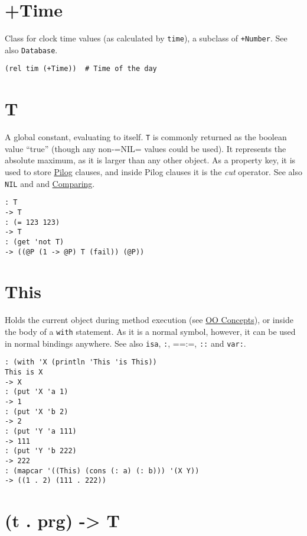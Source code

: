 {{{{{{{{ 
\section{+Time}
\label{sec-8-1-20-3}


Class for clock time values (as calculated by \texttt{time}), a subclass of
\texttt{+Number}. See also \texttt{Database}.


\begin{verbatim}
(rel tim (+Time))  # Time of the day
\end{verbatim}

 
\section{T}
\label{sec-8-1-20-4}


A global constant, evaluating to itself. \texttt{T} is commonly returned as the
boolean value ``true'' (though any non-=NIL= values could be used). It
represents the absolute maximum, as it is larger than any other object.
As a property key, it is used to store \hyperref[ref.html-pilog]{Pilog}
clauses, and inside Pilog clauses it is the \emph{cut} operator. See also
\texttt{NIL} and and \hyperref[ref.html-cmp]{Comparing}.


\begin{verbatim}
: T
-> T
: (= 123 123)
-> T
: (get 'not T)
-> ((@P (1 -> @P) T (fail)) (@P))
\end{verbatim}

 
\section{This}
\label{sec-8-1-20-5}


Holds the current object during method execution (see \hyperref[ref.html-oop]{OO Concepts}), or inside the body of a \texttt{with} statement. As it is a normal
symbol, however, it can be used in normal bindings anywhere. See also
\texttt{isa}, \texttt{:}, ==:=, \texttt{::} and \texttt{var:}.


\begin{verbatim}
: (with 'X (println 'This 'is This))
This is X
-> X
: (put 'X 'a 1)
-> 1
: (put 'X 'b 2)
-> 2
: (put 'Y 'a 111)
-> 111
: (put 'Y 'b 222)
-> 222
: (mapcar '((This) (cons (: a) (: b))) '(X Y))
-> ((1 . 2) (111 . 222))
\end{verbatim}

 
\section{(t . prg) -> T}
\label{sec-8-1-20-6}


}}}}}}}}
